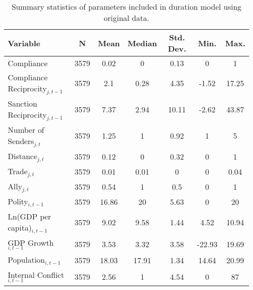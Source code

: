 \begin{table}[ht]
\centering
{\normalsize
\begin{tabular}{lcccccc}
 Variable & N & Mean & Median & Std. Dev. & Min. & Max. \\ 
  \hline
\hline
Compliance & 3579 & 0.02 & 0 & 0.13 & 0 & 1 \\ 
  Compliance Reciprocity$_{j,t-1}$ & 3579 & 2.1 & 0.28 & 4.35 & -1.52 & 17.25 \\ 
  Sanction Reciprocity$_{j,t-1}$ & 3579 & 7.37 & 2.94 & 10.11 & -2.62 & 43.87 \\ 
  Number of Senders$_{j,t}$ & 3579 & 1.25 & 1 & 0.92 & 1 & 5 \\ 
  Distance$_{j,t}$ & 3579 & 0.12 & 0 & 0.32 & 0 & 1 \\ 
  Trade$_{j,t}$ & 3579 & 0.01 & 0.01 & 0 & 0 & 0.04 \\ 
  Ally$_{j,t}$ & 3579 & 0.54 & 1 & 0.5 & 0 & 1 \\ 
  Polity$_{i,t-1}$ & 3579 & 16.86 & 20 & 5.63 & 0 & 20 \\ 
  Ln(GDP per capita)$_{i,t-1}$ & 3579 & 9.02 & 9.58 & 1.44 & 4.52 & 10.94 \\ 
  GDP Growth$_{i,t-1}$ & 3579 & 3.53 & 3.32 & 3.58 & -22.93 & 19.69 \\ 
  Population$_{i,t-1}$ & 3579 & 18.03 & 17.91 & 1.34 & 14.64 & 20.99 \\ 
  Internal Conflict$_{i,t-1}$ & 3579 & 2.56 & 1 & 4.54 & 0 & 87 \\ 
   \hline
\hline
\end{tabular}
}
\caption{Summary statistics of parameters included in duration model using original data.} 
\label{tab:summNoImp}
\end{table}
